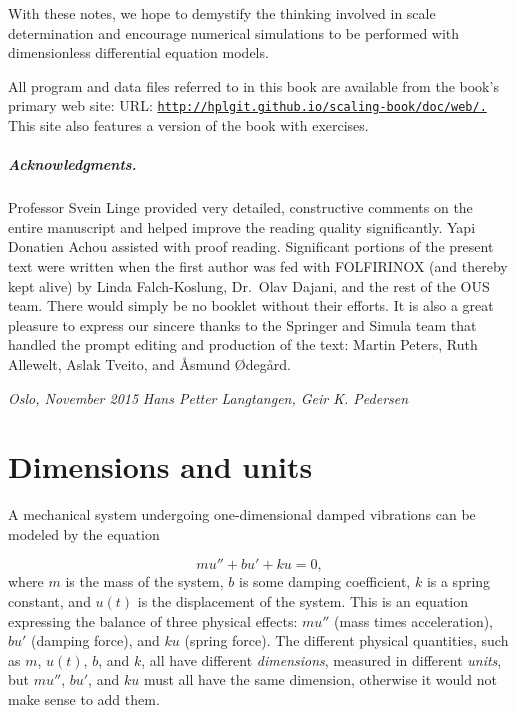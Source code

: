 \documentclass[graybox,envcountchap,sectrefs,final]{svmonodo}
\begin{document}
With these notes, we hope to demystify the thinking involved in scale
determination and encourage numerical simulations to be performed with
dimensionless differential equation models.

All program and data files referred to in this book are available
from the book's primary web site:
URL: \href{{http://hplgit.github.io/scaling-book/doc/web/.}}{\nolinkurl{http://hplgit.github.io/scaling-book/doc/web/.}}
This site also features a version of the book with exercises.

\paragraph{Acknowledgments.}
Professor Svein Linge
provided very detailed, constructive comments on the entire manuscript
and helped improve the reading quality significantly.
Yapi Donatien Achou assisted with proof reading.
Significant portions of
the present text were written when the first author was fed with
FOLFIRINOX (and thereby kept alive) by Linda Falch-Koslung, Dr.~Olav
Dajani, and the rest of the OUS team. There would simply be no booklet
without their efforts. It is also a great pleasure to express our
sincere thanks to the Springer and Simula team that handled the prompt
editing and production of the text: Martin Peters, Ruth Allewelt,
Aslak Tveito, and Åsmund Ødegård.

\vspace{1cm}

\noindent
{\it Oslo, November 2015}  \hfill  {\it Hans Petter Langtangen, Geir K. Pedersen}



\tableofcontents


\vspace{1cm} %

\mainmatter





\chapter{Dimensions and units}
\label{scale:dimunit}


A mechanical system undergoing one-dimensional damped vibrations can be
modeled by the equation

\begin{equation}
mu'' + bu' + ku = 0,
\label{scale:dimunit:eq:u}
\end{equation}
where $m$ is the mass of the system, $b$ is some damping coefficient,
$k$ is a spring constant, and $u(t)$ is the displacement of the
system.  This is an equation expressing the balance of three physical
effects: $mu''$ (mass times acceleration), $bu'$ (damping force), and
$ku$ (spring force).  The different physical quantities, such as $m$,
$u(t)$, $b$, and $k$, all have different \emph{dimensions}, measured in
different \emph{units}, but $mu''$, $bu'$, and $ku$ must all have the same
dimension, otherwise it would not make sense to add them.
\end{document}
